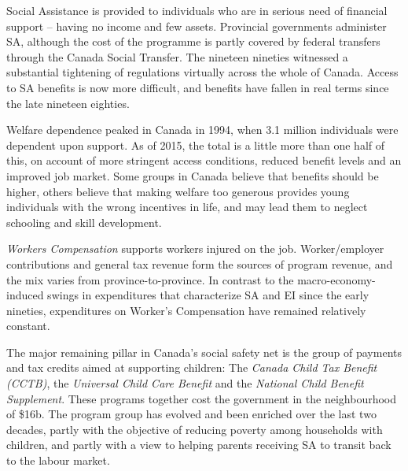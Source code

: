 Social Assistance is provided to individuals who are in serious need of
financial support -- having no income and few assets. Provincial governments
administer SA, although the cost of the programme is partly covered by
federal transfers through the Canada Social Transfer. The nineteen nineties
witnessed a substantial tightening of regulations virtually across the whole
of Canada. Access to SA benefits is now more difficult, and benefits have
fallen in real terms since the late nineteen eighties.

Welfare dependence peaked in Canada in 1994, when 3.1 million individuals
were dependent upon support. As of 2015, the total is a little more than one
half of this, on account of more stringent access conditions, reduced
benefit levels and an improved job market. Some groups in Canada believe
that benefits should be higher, others believe that making welfare too
generous provides young individuals with the wrong incentives in life, and
may lead them to neglect schooling and skill development.

\textit{Workers Compensation} supports workers injured on the job.
Worker/employer contributions and general tax revenue form the sources of
program revenue, and the mix varies from province-to-province. In contrast
to the macro-economy-induced swings in expenditures that characterize SA and
EI since the early nineties, expenditures on Worker's Compensation have
remained relatively constant.

\newhtmlpage

The major remaining pillar in Canada's social safety net is the group of 
payments and tax credits aimed at supporting children: The \textit{Canada 
Child Tax Benefit (CCTB)}, the \textit{Universal Child Care Benefit} and the
\textit{National Child Benefit Supplement}. These programs together cost the
government in the neighbourhood of \$16b. The program group has
evolved and been enriched over the last two decades, partly with the
objective of reducing poverty among households with children, and partly
with a view to helping parents receiving SA to transit back to the labour
market.


